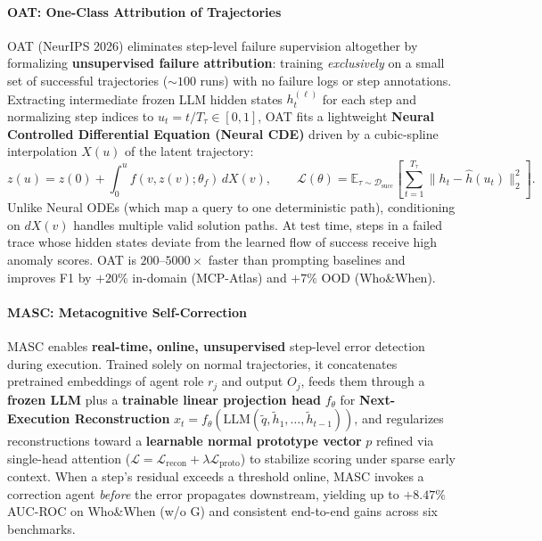 \paragraph{OAT: One-Class Attribution of Trajectories~\citep{yeh2026oat}}
OAT (NeurIPS 2026) eliminates step-level failure supervision altogether by formalizing \textbf{unsupervised failure attribution}: training \emph{exclusively} on a small set of successful trajectories ($\sim 100$ runs) with no failure logs or step annotations. Extracting intermediate frozen LLM hidden states $h_t^{(\ell)}$ for each step and normalizing step indices to $u_t = t/T_\tau \in [0,1]$, OAT fits a lightweight \textbf{Neural Controlled Differential Equation (Neural CDE)} driven by a cubic-spline interpolation $X(u)$ of the latent trajectory:
\begin{equation}
  z(u) = z(0) + \int_0^u f(v, z(v); \theta_f)\, dX(v), \qquad \mathcal{L}(\theta) = \mathbb{E}_{\tau \sim \mathcal{D}_{\text{succ}}}\!\left[\sum_{t=1}^{T_\tau} \|h_t - \hat{h}(u_t)\|_2^2\right].
\end{equation}
Unlike Neural ODEs (which map a query to one deterministic path), conditioning on $dX(v)$ handles multiple valid solution paths. At test time, steps in a failed trace whose hidden states deviate from the learned flow of success receive high anomaly scores. OAT is $200$--$5000\times$ faster than prompting baselines and improves F1 by $+20\%$ in-domain (MCP-Atlas) and $+7\%$ OOD (Who\&When).

\paragraph{MASC: Metacognitive Self-Correction~\citep{shen2026masc}}
MASC enables \textbf{real-time, online, unsupervised} step-level error detection during execution. Trained solely on normal trajectories, it concatenates pretrained embeddings of agent role $r_j$ and output $O_j$, feeds them through a \textbf{frozen LLM} plus a \textbf{trainable linear projection head} $f_\theta$ for \textbf{Next-Execution Reconstruction} $\hat{x}_t = f_\theta(\text{LLM}(\tilde{q}, \tilde{h}_1, \dots, \tilde{h}_{t-1}))$, and regularizes reconstructions toward a \textbf{learnable normal prototype vector} $p$ refined via single-head attention ($\mathcal{L} = \mathcal{L}_{\text{recon}} + \lambda \mathcal{L}_{\text{proto}}$) to stabilize scoring under sparse early context. When a step's residual exceeds a threshold online, MASC invokes a correction agent \emph{before} the error propagates downstream, yielding up to $+8.47\%$ AUC-ROC on Who\&When (w/o G) and consistent end-to-end gains across six benchmarks.


